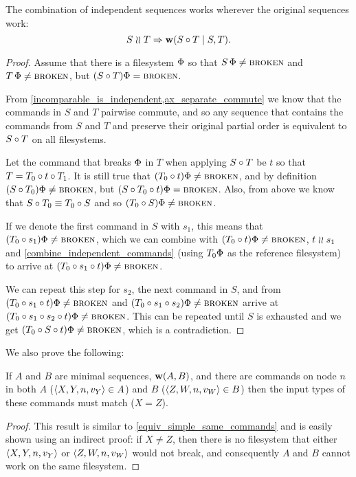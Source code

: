 \begin{mylem}\label{combine_independent_sequences}
The combination of independent sequences works wherever the original sequences work:
\[ S\mathrel{\wr\wr} T \Rightarrow \mathbf{w}({S\circ T}\mathrel{|}{S,T}). \]
\end{mylem}
\begin{proof}
Assume that there is a filesystem $\Phi$ so that
$S\,\Phi\neq\text{\normalfont\scshape{broken}}$ and $T\,\Phi\neq\text{\normalfont\scshape{broken}}$, but
$(S\circ T)\Phi=\text{\normalfont\scshape{broken}}$.

From \cref{incomparable_is_independent,ax_separate_commute} we know that
the commands in $S$ and $T$ pairwise commute, and so any sequence
that contains the commands from $S$ and $T$ and preserve their original partial order
is equivalent to $S\circ T$ on all filesystems.

Let the command that breaks $\Phi$ in $T$ when applying $S\circ T$ be $t$
so that $T=T_0\circ t\circ T_1$.
It is still true that $(T_0 \circ t)\Phi\neq\text{\normalfont\scshape{broken}}$,
and by definition $(S\circ T_0)\Phi\neq\text{\normalfont\scshape{broken}}$,
but $(S\circ T_0\circ t)\Phi=\text{\normalfont\scshape{broken}}$.
Also, from above we know that $S\circ T_0\equiv T_0\circ S$
and so $(T_0 \circ S)\Phi\neq\text{\normalfont\scshape{broken}}$.

If we denote the first command in $S$ with $s_1$,
this means that $(T_0 \circ s_1)\Phi\neq\text{\normalfont\scshape{broken}}$,
which we can combine with $(T_0 \circ t)\Phi\neq\text{\normalfont\scshape{broken}}$, $t\mathrel{\wr\wr} s_1$ and
\cref{combine_independent_commands}
(using $T_0\Phi$ as the reference filesystem)
to arrive at $(T_0 \circ s_1\circ t)\Phi\neq\text{\normalfont\scshape{broken}}$.

We can repeat this step for $s_2$, the next command in $S$,
and from 
$(T_0 \circ s_1\circ t)\Phi\neq\text{\normalfont\scshape{broken}}$
and
$(T_0 \circ s_1\circ s_2)\Phi\neq\text{\normalfont\scshape{broken}}$
arrive at
$(T_0 \circ s_1\circ s_2\circ t)\Phi\neq\text{\normalfont\scshape{broken}}$.
This can be repeated until $S$ is exhausted and we get
$(T_0 \circ S\circ t)\Phi\neq\text{\normalfont\scshape{broken}}$, which is a contradiction.
\end{proof}

We also prove the following:

\begin{mylem}\label{worksinputmatch}
If $A$ and $B$ are minimal sequences, $\mathbf{w}({A,B})$,
and there are commands on node $n$ in both $A$ ($\langle{X,Y,n,v_Y}\rangle\in A$) and $B$ ($\langle{Z,W,n,v_W}\rangle\in B$)
then the input types of these commands must match ($X=Z$).
\end{mylem}
\begin{proof}
This result is similar to \cref{equiv_simple_same_commands} and
is easily shown using an indirect proof: if $X\neq Z$, then there is no filesystem that
either $\langle{X,Y,n,v_Y}\rangle$ or $\langle{Z,W,n,v_W}\rangle$ would not break, 
and consequently $A$ and $B$ cannot work on the same filesystem.
\end{proof}


